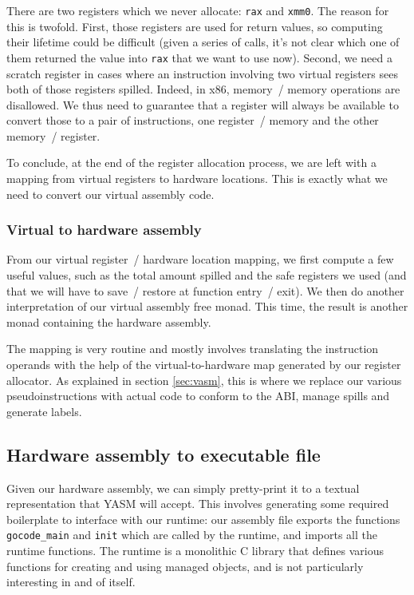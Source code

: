 \documentclass[letterpaper,11pt]{article}
\begin{document}
There are two registers which we never allocate: \texttt{rax} and \texttt{xmm0}. The reason for this is twofold. First, those registers are used for return values, so computing their lifetime could be difficult (given a series of calls, it's not clear which one of them returned the value into \texttt{rax} that we want to use now). Second, we need a scratch register in cases where an instruction involving two virtual registers sees both of those registers spilled. Indeed, in x86, memory~/ memory operations are disallowed. We thus need to guarantee that a register will always be available to convert those to a pair of instructions, one register~/ memory and the other memory~/ register.

To conclude, at the end of the register allocation process, we are left with a mapping from virtual registers to hardware locations. This is exactly what we need to convert our virtual assembly code.

\subsubsection{Virtual to hardware assembly}

From our virtual register~/ hardware location mapping, we first compute a few useful values, such as the total amount spilled and the safe registers we used (and that we will have to save~/ restore at function entry~/ exit). We then do another interpretation of our virtual assembly free monad. This time, the result is another monad containing the hardware assembly.

The mapping is very routine and mostly involves translating the instruction operands with the help of the virtual-to-hardware map generated by our register allocator. As explained in section \ref{sec:vasm}, this is where we replace our various pseudoinstructions with actual code to conform to the ABI, manage spills and generate labels.

\subsection{Hardware assembly to executable file}

Given our hardware assembly, we can simply pretty-print it to a textual representation that YASM will accept. This involves generating some required boilerplate to interface with our runtime: our assembly file exports the functions \texttt{gocode\_main} and \texttt{init} which are called by the runtime, and imports all the runtime functions. The runtime is a monolithic C library that defines various functions for creating and using managed objects, and is not particularly interesting in and of itself.
\end{document}
